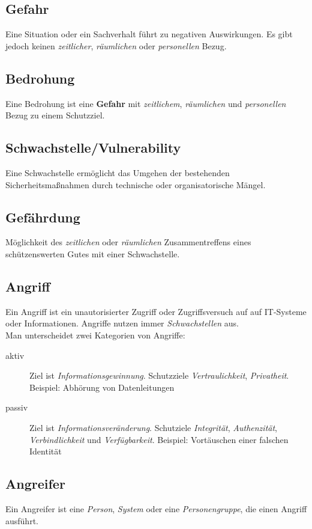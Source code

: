 \documentclass{book}
\begin{document}
\subsection{Gefahr}
Eine Situation oder ein Sachverhalt führt zu negativen Auswirkungen. Es gibt jedoch keinen \textit{zeitlicher}, \textit{räumlichen} oder \textit{personellen} Bezug.
\subsection{Bedrohung}
Eine Bedrohung ist eine \textbf{Gefahr} mit \textit{zeitlichem}, \textit{räumlichen} und \textit{personellen} Bezug zu einem Schutzziel.
\subsection{Schwachstelle/Vulnerability}
Eine Schwachstelle ermöglicht das Umgehen der bestehenden Sicherheitsmaßnahmen durch technische oder organisatorische Mängel.
\subsection{Gefährdung}
Möglichkeit des \textit{zeitlichen} oder \textit{räumlichen} Zusammentreffens eines schützenswerten Gutes mit einer Schwachstelle.
\subsection{Angriff}
Ein Angriff ist ein unautorisierter Zugriff oder Zugriffsversuch auf auf IT-Systeme oder Informationen.
Angriffe nutzen immer \textit{Schwachstellen} aus. \\
Man unterscheidet zwei Kategorien von Angriffe:
\begin{description}
    \item[aktiv] Ziel ist \textit{Informationsgewinnung}. Schutzziele \textit{Vertraulichkeit}, \textit{Privatheit}. Beispiel: Abhörung von Datenleitungen
    \item[passiv] Ziel ist \textit{Informationsveränderung}. Schutziele \textit{Integrität}, \textit{Authenzität}, \textit{Verbindlichkeit} und 
    \textit{Verfügbarkeit}. Beispiel: Vortäuschen einer falschen Identität
\end{description}
\subsection{Angreifer}
Ein Angreifer ist eine \textit{Person}, \textit{System} oder eine \textit{Personengruppe}, die einen Angriff ausführt.
\end{document}
